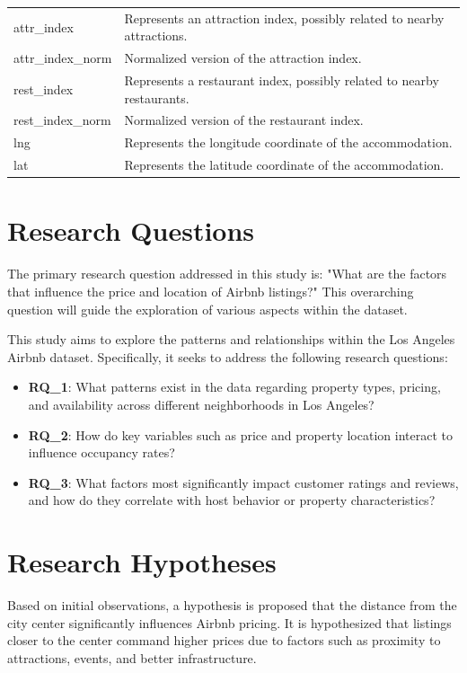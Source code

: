 \documentclass[10pt, conference, compsocconf]{IEEEtran}
\begin{document}
\begin{table}[!htp]
{\begin{tabular}{p{}p{}}
  attr\_index & Represents an attraction index, possibly related to nearby attractions. \\
  attr\_index\_norm & Normalized version of the attraction index. \\
  rest\_index & Represents a restaurant index, possibly related to nearby restaurants. \\
  rest\_index\_norm & Normalized version of the restaurant index. \\
  lng & Represents the longitude coordinate of the accommodation. \\
  lat & Represents the latitude coordinate of the accommodation. \\
  \bottomrule
  \end{tabular}%
  }
\end{table}
  
\lipsum[1]




\lipsum[2-3]

\section{Research Questions}
The primary research question addressed in this study is: "What are the factors that influence the price and location of Airbnb listings?" 
This overarching question will guide the exploration of various aspects within the dataset.

\lipsum[2]

This study aims to explore the patterns and relationships within the Los Angeles Airbnb dataset. Specifically, it seeks to address the following research questions:
\begin{itemize}
    \item \textbf{RQ\_1}: What patterns exist in the data regarding property types, pricing, and availability across different neighborhoods in Los Angeles?
    \item \textbf{RQ\_2}: How do key variables such as price and property location interact to influence occupancy rates?
    \item \textbf{RQ\_3}: What factors most significantly impact customer ratings and reviews, and how do they correlate with host behavior or property characteristics?
\end{itemize}

\lipsum[3]

\section{Research Hypotheses}
Based on initial observations, a hypothesis is proposed that the distance from the city center significantly influences Airbnb pricing. 
It is hypothesized that listings closer to the center command higher prices due to factors such as proximity to attractions, events, and better infrastructure.
\end{document}
